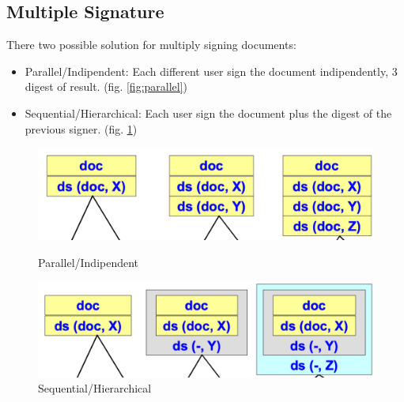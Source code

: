 \documentclass[12pt]{article}
\begin{document}
\subsection{Multiple Signature}
There two possible solution for multiply signing documents:
\begin{itemize}
  \item Parallel/Indipendent: Each different user sign the document indipendently, 3 digest of result. (fig. \ref{fig:parallel})
  \item Sequential/Hierarchical: Each user sign the document plus the digest of the previous signer. (fig. \ref{fig:sequential})
\end{itemize}
\begin{figure}[h!]
  \centering
  \begin{minipage}{.48\textwidth}
    \centering
    \includegraphics[width=\linewidth]{images/parallel.png}
    \caption{Parallel/Indipendent}
    \label{fig:parallel}
  \end{minipage}\hfill
  \begin{minipage}{.48\textwidth}
    \centering
    \includegraphics[width=\linewidth]{images/sequential.png}
    \caption{Sequential/Hierarchical}
    \label{fig:sequential}
  \end{minipage}\hfill
\end{figure}
\end{document}

